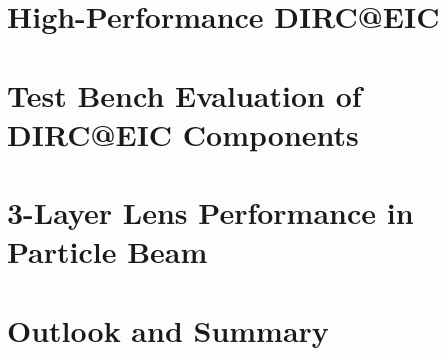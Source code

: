 \documentclass[12pt]{report}
\numberwithin{equation}{chapter}
\begin{document}
\chapter{High-Performance DIRC@EIC}
%
\chapter{Test Bench Evaluation of DIRC@EIC Components}
%
\chapter{3-Layer Lens Performance in Particle Beam}
%
\chapter{Outlook and Summary}



{}



\appendix


\newpage


\vitapage
\end{document}
